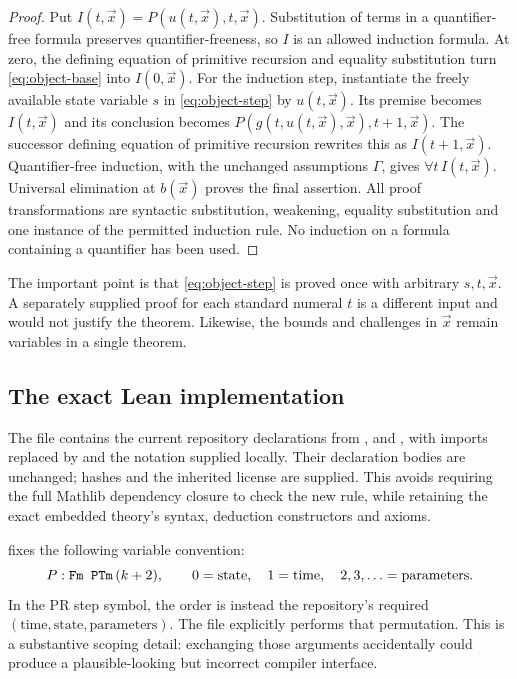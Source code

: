 \begin{proof}
Put $I(t,\vec x)=P(u(t,\vec x),t,\vec x)$. Substitution of terms in a
quantifier-free formula preserves quantifier-freeness, so $I$ is an allowed
induction formula. At zero, the defining equation of primitive recursion
and equality substitution turn \eqref{eq:object-base} into $I(0,\vec x)$.
For the induction step, instantiate the freely available state variable
$s$ in \eqref{eq:object-step} by $u(t,\vec x)$. Its premise becomes
$I(t,\vec x)$ and its conclusion becomes
$P(g(t,u(t,\vec x),\vec x),t+1,\vec x)$. The successor defining equation
of primitive recursion rewrites this as $I(t+1,\vec x)$.
Quantifier-free induction, with the unchanged assumptions $\Gamma$, gives
$\forall t\,I(t,\vec x)$. Universal elimination at $b(\vec x)$ proves
the final assertion. All proof transformations are syntactic substitution,
weakening, equality substitution and one instance of the permitted induction
rule. No induction on a formula containing a quantifier has been used.
\end{proof}

The important point is that \eqref{eq:object-step} is proved once with
arbitrary $s,t,\vec x$. A separately supplied proof for each standard
numeral $t$ is a different input and would not justify the theorem. Likewise,
the bounds and challenges in $\vec x$ remain variables in a single theorem.

\subsection{The exact Lean implementation}

The file  contains the current repository
declarations from ,  and
, with imports replaced by  and the notation
 supplied locally. Their declaration bodies are unchanged; hashes
and the inherited license are supplied. This avoids requiring the full
Mathlib dependency closure to check the new rule, while retaining the exact
embedded theory's syntax, deduction constructors and axioms.

 fixes the following variable convention:
\[
 P:\texttt{Fm PTm}\,(k+2),\qquad
 0=\text{state},\quad1=\text{time},\quad2,3,\ldots=\text{parameters}.
\]
In the PR step symbol, the order is instead the repository's required
$(\text{time},\text{state},\text{parameters})$. The file explicitly performs
that permutation. This is a substantive scoping detail: exchanging those
arguments accidentally could produce a plausible-looking but incorrect
compiler interface.

